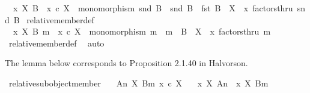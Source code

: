 \begin{isabellebody}
\ \ {\isachardoublequoteopen}x\ {\isasymin}\isactrlbsub X\isactrlesub \ B\ {\isasymlongleftrightarrow}\ {\isacharparenleft}{\kern0pt}x\ {\isasymin}\isactrlsub c\ X\ {\isasymand}\ monomorphism\ {\isacharparenleft}{\kern0pt}snd\ B{\isacharparenright}{\kern0pt}\ {\isasymand}\ snd\ B\ {\isacharcolon}{\kern0pt}\ fst\ B\ {\isasymrightarrow}\ X\ {\isasymand}\ x\ factorsthru\ {\isacharparenleft}{\kern0pt}snd\ B{\isacharparenright}{\kern0pt}{\isacharparenright}{\kern0pt}{\isachardoublequoteclose}\isanewline
\isanewline
{}\isamarkupfalse%
\ relative{\isacharunderscore}{\kern0pt}member{\isacharunderscore}{\kern0pt}def{}{\isacharcolon}{\kern0pt}\isanewline
\ \ {\isachardoublequoteopen}x\ {\isasymin}\isactrlbsub X\isactrlesub \ {\isacharparenleft}{\kern0pt}B{\isacharcomma}{\kern0pt}\ m{\isacharparenright}{\kern0pt}\ {\isacharequal}{\kern0pt}\ {\isacharparenleft}{\kern0pt}x\ {\isasymin}\isactrlsub c\ X\ {\isasymand}\ monomorphism\ m\ {\isasymand}\ m\ {\isacharcolon}{\kern0pt}\ B\ {\isasymrightarrow}\ X\ {\isasymand}\ x\ factorsthru\ m{\isacharparenright}{\kern0pt}{\isachardoublequoteclose}\isanewline
%
\isadelimproof
\ \ %
\endisadelimproof
%
\isatagproof
{}\isamarkupfalse%
\ relative{\isacharunderscore}{\kern0pt}member{\isacharunderscore}{\kern0pt}def\ \isamarkupfalse%
\ auto%
\endisatagproof
{\isafoldproof}%
%
\isadelimproof
%
\endisadelimproof
%
\begin{isamarkuptext}%
The lemma below corresponds to Proposition 2.1.40 in Halvorson.%
\end{isamarkuptext}\isamarkuptrue%
\isamarkupfalse%
\ relative{\isacharunderscore}{\kern0pt}subobject{\isacharunderscore}{\kern0pt}member{\isacharcolon}{\kern0pt}\isanewline
\ \ \ {\isachardoublequoteopen}{\isacharparenleft}{\kern0pt}A{\isacharcomma}{\kern0pt}n{\isacharparenright}{\kern0pt}\ {\isasymsubseteq}\isactrlbsub X\isactrlesub \ {\isacharparenleft}{\kern0pt}B{\isacharcomma}{\kern0pt}m{\isacharparenright}{\kern0pt}{\isachardoublequoteclose}\ {\isachardoublequoteopen}x\ {\isasymin}\isactrlsub c\ X{\isachardoublequoteclose}\isanewline
\ \ \ {\isachardoublequoteopen}x\ {\isasymin}\isactrlbsub X\isactrlesub \ {\isacharparenleft}{\kern0pt}A{\isacharcomma}{\kern0pt}n{\isacharparenright}{\kern0pt}\ {\isasymLongrightarrow}\ x\ {\isasymin}\isactrlbsub X\isactrlesub \ {\isacharparenleft}{\kern0pt}B{\isacharcomma}{\kern0pt}m{\isacharparenright}{\kern0pt}{\isachardoublequoteclose}\isanewline
%
\isadelimproof
\ \ %
\endisadelimproof
%
\isatagproof

\end{isabellebody}
